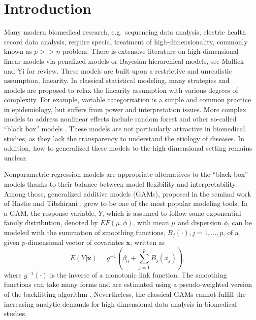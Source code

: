 \documentclass[AMA,STIX1COL,]{WileyNJD-v2}
\begin{document}
\pgfplotsset{compat=1.18}
\usetikzlibrary{shapes.geometric, arrows, positioning, calc, matrix, backgrounds, fit}
\newcommand{\bs}[1]{\boldsymbol{#1}}
\newcommand{\tp}{*}
\newcommand{\pr}{\text{Pr}}
\newcommand{\repa}{\text{repa}}
\newcommand{\simiid}{\overset{\text{iid}}{\sim}}

\hypertarget{introduction}{%
\section{Introduction}\label{introduction}}

\label{sec:intro}

Many modern biomedical research, e.g.~sequencing data analysis, electric
health record data analysis, require special treatment of
high-dimensionality, commonly known as \(p >> n\) problem. There is
extensive literature on high-dimensional linear models via penalized
models or Bayesian hierarchical models, see Mallick and Yi
\citep{Mallick2013} for review. These models are built upon a
restrictive and unrealistic assumption, linearity. In classical
statistical modeling, many strategies and models are proposed to relax
the linearity assumption with various degrees of complexity. For
example, variable categorization is a simple and common practice in
epidemiology, but suffers from power and interpretation issues. More
complex models to address nonlinear effects include random forest and
other so-called ``black box'' models \citep{Breiman2001}. These models
are not particularly attractive in biomedical studies, as they lack the
transparency to understand the etiology of diseases. In addition, how to
generalized these models to the high-dimensional setting remains
unclear.

Nonparametric regression models are appropriate alternatives to the
``black-box'' models thanks to their balance between model flexibility
and interpretability. Among those, generalized additive models (GAMs),
proposed in the seminal work of Hastie and Tibshirani
\citep{Hastie1987}, grew to be one of the most popular modeling tools.
In a GAM, the response variable, \(Y\), which is assumed to follow some
exponential family distribution, denoted by \(EF(\mu, \phi)\), with mean
\(\mu\) and dispersion \(\phi\), can be modeled with the summation of
smoothing functions, \(B_j(\cdot), j = 1, \dots, p\), of a given
\(p\)-dimensional vector of covariates \(\boldsymbol{x}\), written as \[
 E(Y|\boldsymbol{x}) = g^{-1}(\beta_0 + \sum\limits^p_{j=1}B_j(x_j)),
\] where \(g^{-1}(\cdot)\) is the inverse of a monotonic link function.
The smoothing functions can take many forms and are estimated using a
pseudo-weighted version of the backfitting algorithm
\citep{Breiman1985}. Nevertheless, the classical GAMs cannot fulfill the
increasing analytic demands for high-dimensional data analysis in
biomedical studies.
\end{document}
